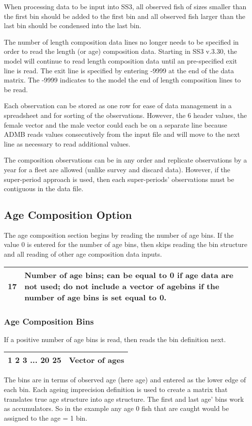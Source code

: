 When processing data to be input into SS3, all observed fish of sizes smaller than the first bin should be added to the first bin and all observed fish larger than the last bin should be condensed into the last bin.	

The number of length composition data lines no longer needs to be specified in order to read the length (or age) composition data. Starting in SS3 v.3.30, the model will continue to read length composition data until an pre-specified exit line is read.  The exit line is specified by entering -9999 at the end of the data matrix. The -9999 indicates to the model the end of length composition lines to be read.

Each observation can be stored as one row for ease of data management in a spreadsheet and for sorting of the observations.  However, the 6 header values, the female vector and the male vector could each be on a separate line because ADMB reads values consecutively from the input file and will move to the next line as necessary to read additional values.

The composition observations can be in any order and replicate observations by a year for a fleet are allowed (unlike survey and discard data).  However, if the super-period approach is used, then each super-periods' observations must be contiguous in the data file.

\subsection{Age Composition Option}
The age composition section begins by reading the number of age bins.  If the value 0 is entered for the number of age bins, then skips reading the bin structure and all reading of other age composition data inputs.
\begin{center}
	\begin{tabular}{p{2cm} p{13cm}  }
		\hline
		17 \Tstrut & Number of age bins; can be equal to 0 if age data are not used; do not include a vector of agebins if the number of age bins is set equal to 0.\Bstrut\\
		\hline
	\end{tabular}
\end{center}


\subsubsection{Age Composition Bins}
If a positive number of age bins is read, then reads the bin definition next.
\begin{center}
	\begin{tabular}{p{3cm} p{12cm}  }
		\hline
		1 2 3 ... 20 25 & Vector of ages\Tstrut\Bstrut\\
		\hline		
	\end{tabular}
\end{center}
The bins are in terms of observed age (here age) and entered as the lower edge of each bin. Each ageing imprecision definition is used to create a matrix that translates true age structure into age structure. The first and last age' bins work as accumulators.  So in the example any age 0 fish that are caught would be assigned to the age = 1 bin.

